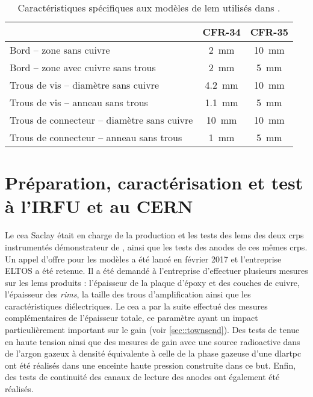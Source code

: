       \begin{table}
        \centering
        \begin{tabular}{|l|c|c|}
          \hline
           & CFR-34 & CFR-35\\
          \hline
          Bord -- zone sans cuivre & \SI{2}{\milli\meter} & \SI{10}{\milli\meter}\\
          Bord -- zone avec cuivre sans trous & \SI{2}{\milli\meter} & \SI{5}{\milli\meter}\\
          Trous de vis -- diamètre sans cuivre & \SI{4.2}{\milli\meter} & \SI{10}{\milli\meter} \\
          Trous de vis -- anneau sans trous &  \SI{1.1}{\milli\meter} & \SI{5}{\milli\meter} \\
          Trous de connecteur -- diamètre sans cuivre & \SI{10}{\milli\meter} & \SI{10}{\milli\meter} \\
          Trous de connecteur -- anneau sans trous & \SI{1}{\milli\meter} & \SI{5}{\milli\meter} \\
          \hline
        \end{tabular}
        \caption[Caractéristiques spécifiques aux modèles de LEM utilisés dans \protodp{}]{\label{tab::lem_diff}Caractéristiques spécifiques aux modèles de \gls{lem} utilisés dans \protodp{}.}
      \end{table}

  \section{Préparation, caractérisation et test à l'IRFU et au CERN}
    
    Le \gls{cea} Saclay était en charge de la production et les tests des \glspl{lem} des deux \glspl{crp} instrumentés démonstrateur de \SSS{}, ainsi que les tests des anodes de ces mêmes \glspl{crp}. Un appel d'offre pour les modèles a été lancé en février 2017 et l'entreprise ELTOS a été retenue. Il a été demandé à l'entreprise d'effectuer plusieurs mesures sur les \glspl{lem} produits : l'épaisseur de la plaque d'époxy et des couches de cuivre, l'épaisseur des \textit{rims}, la taille des trous d'amplification ainsi que les caractéristiques diélectriques. Le \gls{cea} a par la suite effectué des mesures complémentaires de l'épaisseur totale, ce paramètre ayant un impact particulièrement important sur le gain (voir \autoref{sec::townsend}). Des tests de tenue en haute tension ainsi que des mesures de gain avec une source radioactive dans de l'argon gazeux à densité équivalente à celle de la phase gazeuse d'une \gls{dlartpc} ont été réalisés dans une enceinte haute pression construite dans ce but. Enfin, des tests de continuité des canaux de lecture des anodes ont également été réalisés.
        
